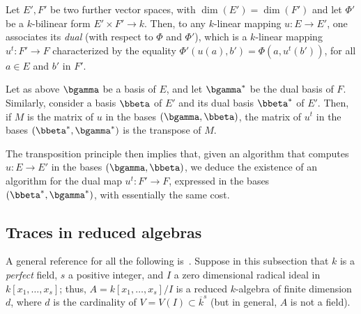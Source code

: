 \documentclass{sig-alternate}
\def\mulmod {\ensuremath{\mathrm{mulmod}}}
\begin{document}
Let $E',F'$ be two further vector spaces, with $\dim(E')=\dim(F')$ and
let $\Phi'$ be a $k$-bilinear form $E'\times F' \to k$. Then, to any
$k$-linear mapping $u:E\to E'$, one associates its {\em dual} (with
respect to $\Phi$ and $\Phi'$), which is a $k$-linear mapping $u^t: F'
\to F$ characterized by the equality $\Phi'(u(a),b')=\Phi(a,u^t(b'))$,
for all $a\in E$ and $b'$ in $F'$.  

Let as above $\bgamma$ be a basis of $E$, and let $\bgamma^\ast$ be
the dual basis of $F$. Similarly, consider a basis $\bbeta$ of $E'$
and its dual basis $\bbeta^\ast$ of $E'$. Then, if $M$ is the matrix
of $u$ in the bases $(\bgamma,\bbeta)$, the matrix of $u^t$ in the
bases $(\bbeta^\ast,\bgamma^\ast)$ is the transpose of $M$.

The transposition principle then implies that, given an algorithm that
computes $u: E \to E'$ in the bases $(\bgamma,\bbeta)$, we deduce the
existence of an algorithm for the dual map $u^t: F' \to F$, expressed
in the bases $(\bbeta^\ast,\bgamma^\ast)$, with essentially the same
cost.
 


\subsection{Traces in reduced algebras}

A general reference for all the following
is~\cite{Cox-Little-OShea:UAG2005}. Suppose in this subsection that
$k$ is a {\em perfect} field, $s$ a positive integer, and $I$ a zero
dimensional radical ideal in $k[x_1,\dots,x_s]$; thus,
$A=k[x_1,\dots,x_s]/I$ is a reduced $k$-algebra of finite dimension
$d$, where $d$ is the cardinality of $V=V(I) \subset\overline{k}^s$
(but in general, $A$ is not a field).
\end{document}
